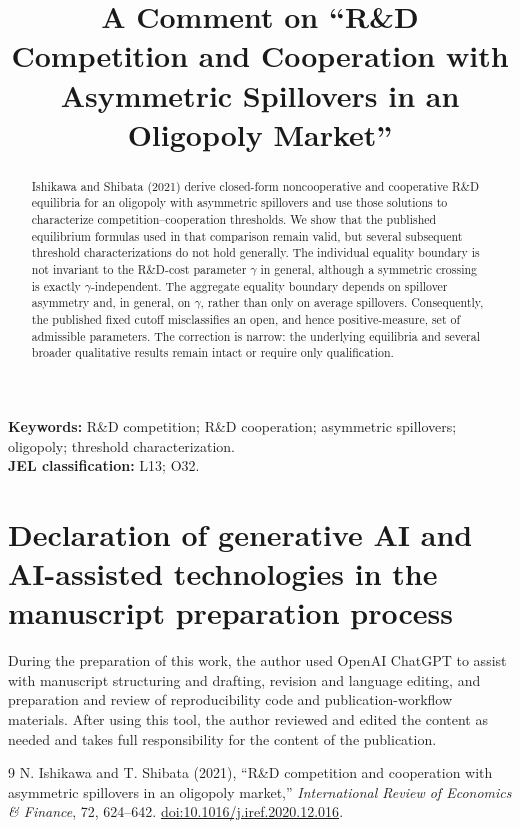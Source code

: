 \documentclass[11pt]{article}
\title{A Comment on ``R\&D Competition and Cooperation with Asymmetric Spillovers in an Oligopoly Market''}
\author{}
\date{}
\begin{document}
\maketitle

\begin{abstract}
Ishikawa and Shibata (2021) derive closed-form noncooperative and cooperative R\&D equilibria for an oligopoly with asymmetric spillovers and use those solutions to characterize competition--cooperation thresholds. We show that the published equilibrium formulas used in that comparison remain valid, but several subsequent threshold characterizations do not hold generally. The individual equality boundary is not invariant to the R\&D-cost parameter $\gamma$ in general, although a symmetric crossing is exactly $\gamma$-independent. The aggregate equality boundary depends on spillover asymmetry and, in general, on $\gamma$, rather than only on average spillovers. Consequently, the published fixed cutoff misclassifies an open, and hence positive-measure, set of admissible parameters. The correction is narrow: the underlying equilibria and several broader qualitative results remain intact or require only qualification.
\end{abstract}

\noindent\textbf{Keywords:} R\&D competition; R\&D cooperation; asymmetric spillovers; oligopoly; threshold characterization.\\
\textbf{JEL classification:} L13; O32.







\appendix





\section*{Declaration of generative AI and AI-assisted technologies in the manuscript preparation process}
During the preparation of this work, the author used OpenAI ChatGPT to assist with manuscript structuring and drafting, revision and language editing, and preparation and review of reproducibility code and publication-workflow materials. After using this tool, the author reviewed and edited the content as needed and takes full responsibility for the content of the publication.

\begin{thebibliography}{9}
N. Ishikawa and T. Shibata (2021),
``R\&D competition and cooperation with asymmetric spillovers in an oligopoly market,''
\textit{International Review of Economics \& Finance}, 72, 624--642.
\href{https://doi.org/10.1016/j.iref.2020.12.016}{doi:10.1016/j.iref.2020.12.016}.
\end{thebibliography}
\end{document}
